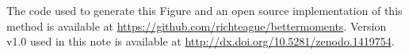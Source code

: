 \documentclass[rnaas]{aastex62}
\begin{document}
The code used to generate this Figure and an open source implementation of
this method is available at
\url{https://github.com/richteague/bettermoments}.
Version v1.0 used in this note is available at 
\url{http://dx.doi.org/10.5281/zenodo.1419754}.



\end{document}
